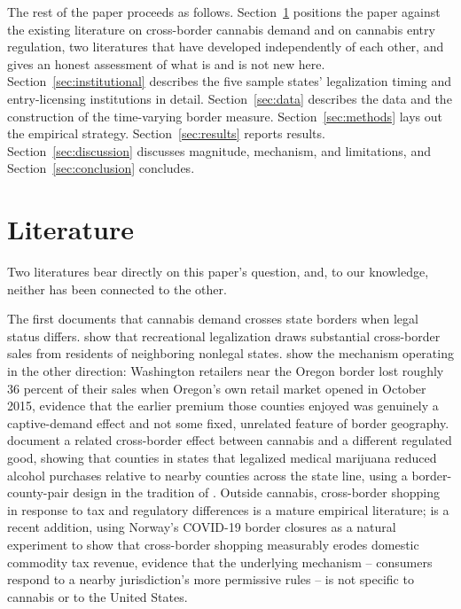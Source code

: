 \documentclass[12pt]{article}
\begin{document}
The rest of the paper proceeds as follows. Section~\ref{sec:lit} positions the paper against the existing
literature on cross-border cannabis demand and on cannabis entry regulation, two literatures that have
developed independently of each other, and gives an honest assessment of what is and is not new here.
Section~\ref{sec:institutional} describes the five sample states' legalization timing and entry-licensing
institutions in detail. Section~\ref{sec:data} describes the data and the construction of the time-varying
border measure. Section~\ref{sec:methods} lays out the empirical strategy. Section~\ref{sec:results} reports
results. Section~\ref{sec:discussion} discusses magnitude, mechanism, and limitations, and
Section~\ref{sec:conclusion} concludes.

\section{Literature}
\label{sec:lit}

Two literatures bear directly on this paper's question, and, to our knowledge, neither has been connected to
the other.

The first documents that cannabis demand crosses state borders when legal status differs. \citet{HaoCowan2020}
show that recreational legalization draws substantial cross-border sales from residents of neighboring
nonlegal states. \citet{HansenMillerWeber2020} show the mechanism operating in the other direction: Washington
retailers near the Oregon border lost roughly 36 percent of their sales when Oregon's own retail market opened
in October 2015, evidence that the earlier premium those counties enjoyed was genuinely a captive-demand effect
and not some fixed, unrelated feature of border geography. \citet{BaggioChongKwon2020} document a related
cross-border effect between cannabis and a different regulated good, showing that counties in states that
legalized medical marijuana reduced alcohol purchases relative to nearby counties across the state line, using
a border-county-pair design in the tradition of \citet{DubeLesterReich2010}. Outside cannabis, cross-border
shopping in response to tax and regulatory differences is a mature empirical literature; \citet{FribergEtAl2024}
is a recent addition, using Norway's COVID-19 border closures as a natural experiment to show that cross-border
shopping measurably erodes domestic commodity tax revenue, evidence that the underlying mechanism -- consumers
respond to a nearby jurisdiction's more permissive rules -- is not specific to cannabis or to the United States.
\end{document}
